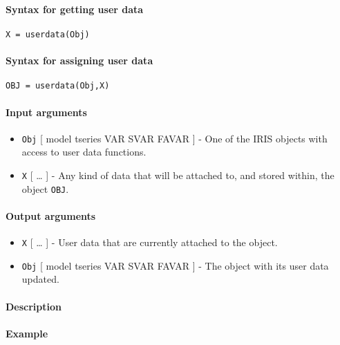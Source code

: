 


	\paragraph{Syntax for getting user
data}

\begin{verbatim}
X = userdata(Obj)
\end{verbatim}

\paragraph{Syntax for assigning user
data}

\begin{verbatim}
OBJ = userdata(Obj,X)
\end{verbatim}

\paragraph{Input arguments}

\begin{itemize}
\item
  \texttt{Obj} {[} model \textbar{} tseries \textbar{} VAR \textbar{}
  SVAR \textbar{} FAVAR {]} - One of the IRIS objects with access to
  user data functions.
\item
  \texttt{X} {[} \ldots{} {]} - Any kind of data that will be attached
  to, and stored within, the object \texttt{OBJ}.
\end{itemize}

\paragraph{Output arguments}

\begin{itemize}
\item
  \texttt{X} {[} \ldots{} {]} - User data that are currently attached to
  the object.
\item
  \texttt{Obj} {[} model \textbar{} tseries \textbar{} VAR \textbar{}
  SVAR \textbar{} FAVAR {]} - The object with its user data updated.
\end{itemize}

\paragraph{Description}

\paragraph{Example}



